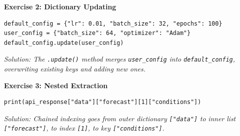 \vspace{1em}
\textbf{Exercise 2: Dictionary Updating}
\begin{lstlisting}
default_config = {"lr": 0.01, "batch_size": 32, "epochs": 100}
user_config = {"batch_size": 64, "optimizer": "Adam"}
default_config.update(user_config)
\end{lstlisting}
\textit{Solution: The \texttt{.update()} method merges \texttt{user\_config} into \texttt{default\_config}, overwriting existing keys and adding new ones.}

\vspace{1em}
\textbf{Exercise 3: Nested Extraction}
\begin{lstlisting}
print(api_response["data"]["forecast"][1]["conditions"])
\end{lstlisting}
\textit{Solution: Chained indexing goes from outer dictionary \texttt{["data"]} to inner list \texttt{["forecast"]}, to index \texttt{[1]}, to key \texttt{["conditions"]}.}
